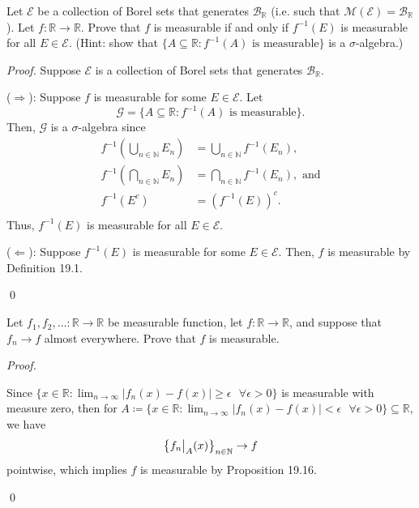 \documentclass[12pt]{article}
\newenvironment{problem}[2][Problem]{\begin{trivlist}
\item[\hskip \labelsep {\bfseries #1}\hskip \labelsep {\bfseries
#2.}]}{\end{trivlist}}
\newenvironment{sol}
    {\emph{Proof.}
    }
    {
    \qed
    }
\newcommand\restr[2]{{%
  \left.\kern-\nulldelimiterspace %
  #1 %
  \vphantom{\big|} %
  \right|_{#2} %
  }}
\begin{document}
\begin{problem}{43}
Let $\mathcal{E}$ be a collection of Borel sets that generates $\mathcal{B}_{\mathbb{R}}$ (i.e. such that $\mathcal{M}(\mathcal{E}) = \mathcal{B}_{\mathbb{R}}$). Let $f : \mathbb{R} \to \mathbb{R}$. Prove that $f$ is measurable if and only if $f^{-1}(E)$ is measurable for all $E \in \mathcal{E}$. (Hint: show that $\{A \subseteq \mathbb{R} : f^{-1}(A)\text{ is measurable}\}$ is a $\sigma$-algebra.)
\end{problem}

\begin{sol} Suppose $\mathcal{E}$ is a collection of Borel sets that generates $\mathcal{B}_{\mathbb{R}}$.

  ($\Longrightarrow$): Suppose $f$ is measurable for some $E \in \mathcal{E}$. Let $$\mathcal{G} = \{A \subseteq \mathbb{R} : f^{-1}(A)\text{ is measurable}\}.$$
  Then, $\mathcal{G}$ is a $\sigma$-algebra since 
  \begin{align*}
    f^{-1}\left( \bigcup_{n \in \mathbb{N}}E_n  \right) &= \bigcup_{n \in \mathbb{N}}f^{-1}(E_n), \\
    f^{-1}\left( \bigcap_{n \in \mathbb{N}}E_n  \right) &= \bigcap_{n \in \mathbb{N}}f^{-1}(E_n), \text{ and}\\
    f^{-1}(E^c) &= \left(f^{-1}(E)\right)^c. \\
  \end{align*}
  Thus, $f^{-1}(E)$ is measurable for all $E \in \mathcal{E}$.

  ($\Longleftarrow$): Suppose $f^{-1}(E)$ is measurable for some $E \in \mathcal{E}$. Then, $f$ is measurable by Definition 19.1.
\end{sol}

\begin{problem}{44}
Let $f_1,f_2,\dots : \mathbb{R} \to \mathbb{R}$ be measurable function, let $f : \mathbb{R} \to \mathbb{R}$, and suppose that $f_n \to f$ almost everywhere. Prove that $f$ is measurable.
\end{problem}

\begin{sol}
  Since $\{x \in \mathbb{R} : \lim_{n \to \infty} |f_n(x) - f(x)| \geq \epsilon \text{ } \forall \epsilon > 0\}$ is measurable with measure zero, then for $A \coloneqq \{x \in \mathbb{R} : \lim_{n \to \infty} |f_n(x) - f(x)| < \epsilon \text{ } \forall \epsilon > 0\} \subseteq \mathbb{R}$, we have 
  $$\left\{\restr{f_n}{A}(x)\right\}_{n \in \mathbb{N}} \to f$$ pointwise, which implies $f$ is measurable by Proposition 19.16.  
\end{sol}

\end{document}
